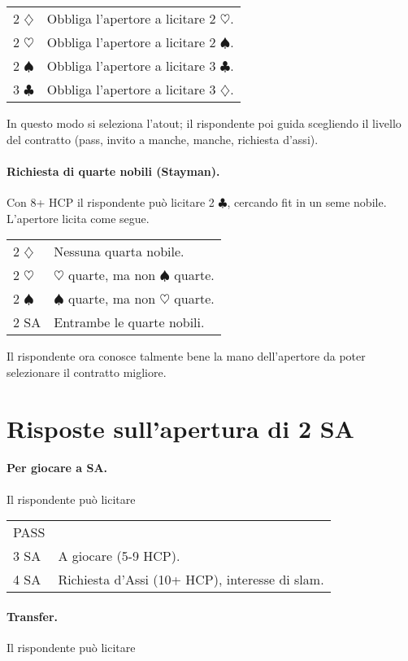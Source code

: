 \documentclass[a4paper,10pt]{article}
\renewcommand{\c}{$\clubsuit$\xspace}
\renewcommand{\d}{$\diamondsuit$\xspace}
\newcommand{\h}{$\heartsuit$\xspace}
\newcommand{\s}{$\spadesuit$\xspace}
\newcommand{\sa}{SA\xspace}
\newcommand{\smallspace}{\vskip0.3cm}
\newenvironment{twocol}
  {\smallspace\noindent\begin{tabular}{l p{0.78\textwidth}}}
  {\end{tabular}\smallspace}
\begin{document}
\begin{twocol}
 2 \d & Obbliga l'apertore a licitare 2 \h.\\
 2 \h & Obbliga l'apertore a licitare 2 \s.\\
 2 \s & Obbliga l'apertore a licitare 3 \c.\\
 3 \c & Obbliga l'apertore a licitare 3 \d.\\
\end{twocol}

In questo modo si seleziona l'atout; il rispondente poi guida scegliendo il livello del contratto (pass, invito a manche, manche, richiesta d'assi).

\paragraph{Richiesta di quarte nobili (Stayman).} Con 8+ HCP il rispondente può licitare 2 \c, cercando fit in un seme nobile. L'apertore licita come segue.

\begin{twocol}
 2 \d & Nessuna quarta nobile.\\
 2 \h & \h quarte, ma non \s quarte.\\
 2 \s & \s quarte, ma non \h quarte.\\
 2 SA & Entrambe le quarte nobili.
\end{twocol}

Il rispondente ora conosce talmente bene la mano dell'apertore da poter selezionare il contratto migliore.

\section{Risposte sull'apertura di 2 \sa}

\paragraph{Per giocare a \sa.} Il rispondente può licitare

\begin{twocol}
 PASS & \\
 3 \sa & A giocare (5-9 HCP).\\
 4 \sa & Richiesta d'Assi (10+ HCP), interesse di slam.
\end{twocol}

\paragraph{Transfer.} Il rispondente può licitare
\end{document}
